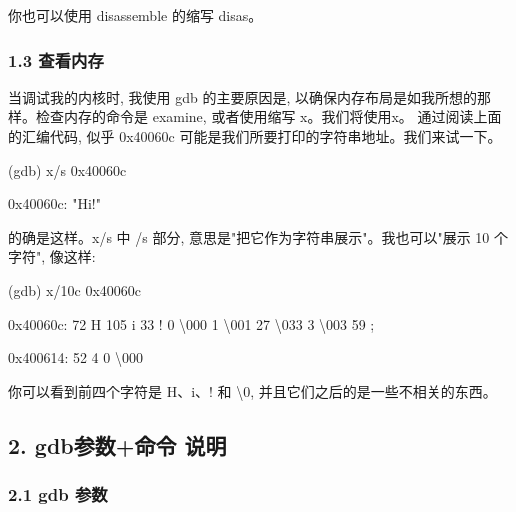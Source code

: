 \documentclass[
]{article}
\newenvironment{Shaded}{}{}
\newcommand{\NormalTok}[1]{#1}
\begin{document}
你也可以使用 disassemble 的缩写 disas。

\hypertarget{13-ux67e5ux770bux5185ux5b58}{%
\subsubsection{1.3 查看内存}\label{13-ux67e5ux770bux5185ux5b58}}

当调试我的内核时, 我使用 gdb 的主要原因是,
以确保内存布局是如我所想的那样。检查内存的命令是 examine, 或者使用缩写
x。我们将使用x。 通过阅读上面的汇编代码, 似乎 0x40060c
可能是我们所要打印的字符串地址。我们来试一下。

\begin{Shaded}
\begin{Highlighting}[]
\NormalTok{(gdb) x/s 0x40060c
}
\NormalTok{0x40060c: "Hi!"}
\end{Highlighting}
\end{Shaded}

的确是这样。x/s 中 /s 部分, 意思是"把它作为字符串展示"。我也可以"展示 10
个字符", 像这样:

\begin{Shaded}
\begin{Highlighting}[]
\NormalTok{(gdb) x/10c 0x40060c
}
\NormalTok{0x40060c: 72 \textquotesingle{}H\textquotesingle{} 105 \textquotesingle{}i\textquotesingle{} 33 \textquotesingle{}!\textquotesingle{} 0 \textquotesingle{}\textbackslash{}000\textquotesingle{} 1 \textquotesingle{}\textbackslash{}001\textquotesingle{} 27 \textquotesingle{}\textbackslash{}033\textquotesingle{} 3 \textquotesingle{}\textbackslash{}003\textquotesingle{} 59 \textquotesingle{};\textquotesingle{}
}
\NormalTok{0x400614: 52 \textquotesingle{}4\textquotesingle{} 0 \textquotesingle{}\textbackslash{}000\textquotesingle{}}
\end{Highlighting}
\end{Shaded}

你可以看到前四个字符是 H、i、! 和 \textbackslash0,
并且它们之后的是一些不相关的东西。

\hypertarget{2-gdbux53c2ux6570ux547dux4ee4-ux8bf4ux660e}{%
\subsection{2. gdb参数+命令
说明}\label{2-gdbux53c2ux6570ux547dux4ee4-ux8bf4ux660e}}

\hypertarget{21-gdb-ux53c2ux6570}{%
\subsubsection{2.1 gdb 参数}\label{21-gdb-ux53c2ux6570}}
\end{document}
